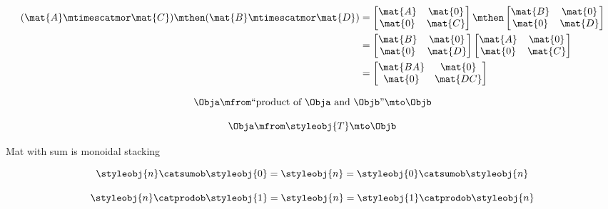 \begin{forslides}
         \begin{align}\label{eq:parallelism-057}
        (\mat{A} \mtimescatmor \mat{C}) \mthen (\mat{B} \mtimescatmor \mat{D}) &=   
        \begin{bmatrix}
        \mat{A} & \mat{0} \\
        \mat{0} & \mat{C}
        \end{bmatrix} 
        \mthen  
        \begin{bmatrix}
        \mat{B} & \mat{0} \\
        \mat{0} & \mat{D}
        \end{bmatrix} \\
        & = 
        \begin{bmatrix}
        \mat{B} & \mat{0} \\
        \mat{0} & \mat{D}
        \end{bmatrix} 
        \begin{bmatrix}
        \mat{A} & \mat{0} \\
        \mat{0} & \mat{C}
        \end{bmatrix} \\
        &=
        \begin{bmatrix}
        \mat{BA} & \mat{0} \\
        \mat{0} & \mat{DC}
        \end{bmatrix}
        \end{align}


    \begin{equation}
        \label{eq:parallelism-058}
        \Obja \mfrom \text{``product of } \Obja \text{ and } \Objb \text{''}  \mto \Objb
    \end{equation}

    \begin{equation}
        \label{eq:parallelism-059}
        \Obja \mfrom \styleobj{T} \mto \Objb
    \end{equation}



Mat with sum is monoidal stacking

    \begin{equation}
        \label{eq:parallelism-060}
        \styleobj{n} \catsumob \styleobj{0} = \styleobj{n} = \styleobj{0} \catsumob \styleobj{n}
    \end{equation}

    \begin{equation}
        \label{eq:parallelism-061}
         \styleobj{n} \catprodob \styleobj{1} = \styleobj{n} = \styleobj{1} \catprodob \styleobj{n}
    \end{equation}


\end{forslides}

